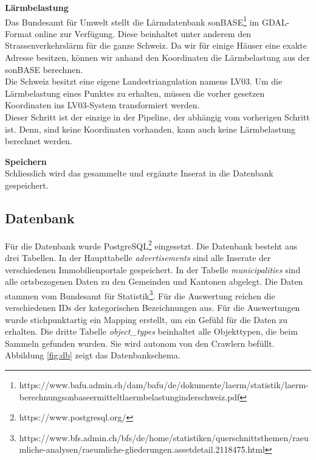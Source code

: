 %
\textbf{Lärmbelastung}\\
Das Bundesamt für Umwelt stellt die Lärmdatenbank sonBASE\footnote{https://www.bafu.admin.ch/dam/bafu/de/dokumente/laerm/statistik/laerm-berechnungsonbaseermitteltlaermbelastunginderschweiz.pdf} im GDAL-Format online zur Verfügung. Diese beinhaltet unter anderem den Strassenverkehrslärm für die ganze Schweiz. Da wir für einige Häuser eine exakte Adresse besitzen, können wir anhand den Koordinaten die Lärmbelastung aus der \mbox{sonBASE} berechnen.\\
Die Schweiz besitzt eine eigene Landestriangulation namens LV03. Um die Lärmbelastung eines Punktes zu erhalten, müssen die vorher gesetzen Koordinaten ins LV03-System transformiert werden.\\
Dieser Schritt ist der einzige in der Pipeline, der abhängig vom vorherigen Schritt ist. Denn, sind keine Koordinaten vorhanden, kann auch keine Lärmbelastung berechnet werden.

\textbf{Speichern}\\
Schliesslich wird das gesammelte und ergänzte Inserat in die Datenbank gespeichert.

\subsection{Datenbank}
Für die Datenbank wurde PostgreSQL\footnote{https://www.postgresql.org/} eingesetzt. Die Datenbank besteht aus drei Tabellen. In der Haupttabelle \textit{advertisements} sind alle Inserate der verschiedenen Immobilienportale gespeichert. In der Tabelle \textit{municipalities} sind alle ortsbezogenen Daten zu den Gemeinden und Kantonen abgelegt. Die Daten stammen vom Bundesamt für Statistik\footnote{https://www.bfs.admin.ch/bfs/de/home/statistiken/querschnittsthemen/raeumliche-analysen/raeumliche-gliederungen.assetdetail.2118475.html}. Für die Auswertung reichen die verschiedenen IDs der kategorischen Bezeichnungen aus. Für die Auswertungen wurde stichpunktartig ein Mapping erstellt, um ein Gefühl für die Daten zu erhalten.
Die dritte Tabelle \textit{object\_types} beinhaltet alle Objekttypen, die beim Sammeln gefunden wurden. Sie wird autonom von den Crawlern befüllt.\\
Abbildung \ref{fig:db} zeigt das Datenbankschema.

